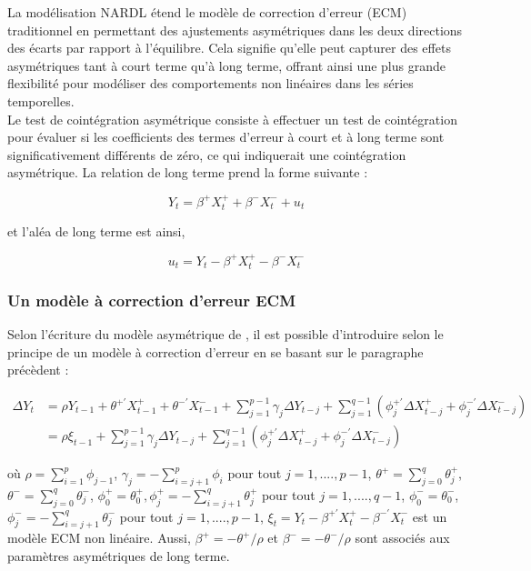 La modélisation NARDL étend le modèle de correction d'erreur (ECM) traditionnel en permettant des ajustements asymétriques dans les deux directions des écarts par rapport à l'équilibre. Cela signifie qu'elle peut capturer des effets asymétriques tant à court terme qu'à long terme, offrant ainsi une plus grande flexibilité pour modéliser des comportements non linéaires dans les séries temporelles.\\

Le test de cointégration asymétrique consiste à effectuer un test de cointégration pour évaluer si les coefficients des termes d'erreur à court et à long terme sont significativement différents de zéro, ce qui indiquerait une cointégration asymétrique. La relation de long terme prend la forme suivante :

\begin{equation}
   Y_t = \beta^+ X_t^+ + \beta^- X_t^- + u_t  
\end{equation}

et l'aléa de long terme est ainsi, 

\begin{equation}
  u_t = Y_t - \beta^+ X_t^+ - \beta^- X_t^-   
\end{equation}

\subsubsection*{\textsf{Un modèle à correction d'erreur ECM}}

Selon l'écriture du modèle asymétrique de \cite{Shin}, il est possible d'introduire selon le principe de \cite{Pesaran} un modèle à correction d'erreur en se basant sur le paragraphe précèdent :

\begin{equation}
\begin{split}
    \Delta Y_t &= \rho Y_{t-1} + \theta^{+'} X^+_{t-1} + \theta^{-'} X_{t-1}^- + \sum_{j=1}^{p-1} \gamma_j \Delta Y_{t-j} + \sum_{j=1}^{q-1} \left ( \phi_j^{+'} \Delta X^+_{t-j} + \phi_j^{-'} \Delta X^-_{t-j} \right ) \\  
    & = \rho \xi_{t-1} + \sum_{j=1}^{p-1} \gamma_j \Delta Y_{t-j} + \sum_{j=1}^{q-1} \left ( \phi_j^{+'} \Delta X^+_{t-j} + \phi_j^{-'} \Delta X^-_{t-j} \right )
\end{split}
\end{equation}

où $\rho = \displaystyle{\sum_{i=1}^p} \phi_{j-1}$, $\gamma_j = -  \displaystyle{\sum_{i=j+1}^p} \phi_i$ pour tout $j = 1, ...., p-1$, $\theta^+ = \displaystyle{\sum_{j=0}^q} \theta_j^+$,  $\theta^- =  \displaystyle{\sum_{j=0}^q} \theta_j^-$, $\phi_0^{+} = \theta_0^+, \phi_j^+ = - \displaystyle{\sum_{i=j+1}^q \theta_j^+}$ pour tout $j = 1, ...., q-1$, $\phi_0^- = \theta_0^-$, $\phi^-_j = -\displaystyle{\sum_{i=j+1}^q} \theta_j^-$ pour tout $j = 1, ...., p-1$, $\xi_t = Y_t - \beta^{+'} X_t^+ - \beta^{-'} X_t^-$ est un modèle ECM non linéaire. Aussi, $\beta^+ = - \theta^+/\rho$ et $\beta^- = - \theta^-/\rho$ sont associés aux paramètres asymétriques de long terme.\\

